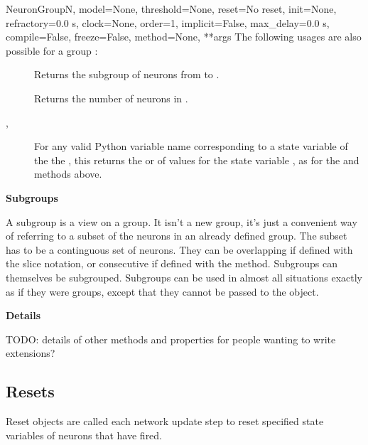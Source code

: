 \documentclass[letterpaper,10pt]{manual}
\begin{document}
\begin{classdesc}{NeuronGroup}{N, model=None, threshold=None, reset=No reset, init=None, refractory=0.0 s, clock=None, order=1, implicit=False, max\_delay=0.0 s, compile=False, freeze=False, method=None, **args}
The following usages are also possible for a group :
\begin{description}
\item[]
Returns the subgroup of neurons from  to .

\item[]
Returns the number of neurons in .

\item[, ]
For any valid Python variable name  corresponding to
a state variable of the the \hyperlink{brian.NeuronGroup}{}, this
returns the  or  of values for the state
variable , as for the \hyperlink{brian.NeuronGroup.state}{} and \hyperlink{brian.NeuronGroup.state_}{} methods
above.

\end{description}

\textbf{Subgroups}

A subgroup is a view on a group. It isn't a new group, it's just
a convenient way of referring to a subset of the neurons in an
already defined group. The subset has to be a continguous set of
neurons. They can be overlapping if defined with the slice
notation, or consecutive if defined with the \hyperlink{brian.NeuronGroup.subgroup}{} method.
Subgroups can themselves be subgrouped. Subgroups can be used in
almost all situations exactly as if they were groups, except that
they cannot be passed to the \hyperlink{brian.Network}{} object.

\textbf{Details}

TODO: details of other methods and properties for people
wanting to write extensions?
\end{classdesc}

\subsection{Resets}

Reset objects are called each network update step to reset
specified state variables of neurons that have fired.
\end{document}
